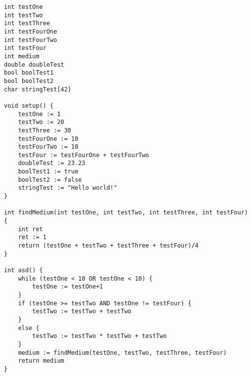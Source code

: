 \begin{lstlisting}[caption={Example full program}, label={ex01}]
int testOne
int testTwo
int testThree
int testFourOne
int testFourTwo
int testFour
int medium
double doubleTest
bool boolTest1
bool boolTest2
char stringTest[42]

void setup() {
	testOne := 1
	testTwo := 20
	testThree := 30
	testFourOne := 10
	testFourTwo := 10
	testFour := testFourOne + testFourTwo
	doubleTest := 23.23
	boolTest1 := true
	boolTest2 := false
	stringTest := "Hello world!"
}

int findMedium(int testOne, int testTwo, int testThree, int testFour) {
	int ret
	ret := 1
	return (testOne + testTwo + testThree + testFour)/4
}

int asd() {
	while (testOne < 10 OR testOne < 10) {
		testOne := testOne+1
	}
	if (testOne >= testTwo AND testOne != testFour) {
		testTwo := testTwo + testTwo
	}
	else {
		testTwo := testTwo * testTwo + testTwo
	}
	medium := findMedium(testOne, testTwo, testThree, testFour)
	return medium
}
\end{lstlisting}